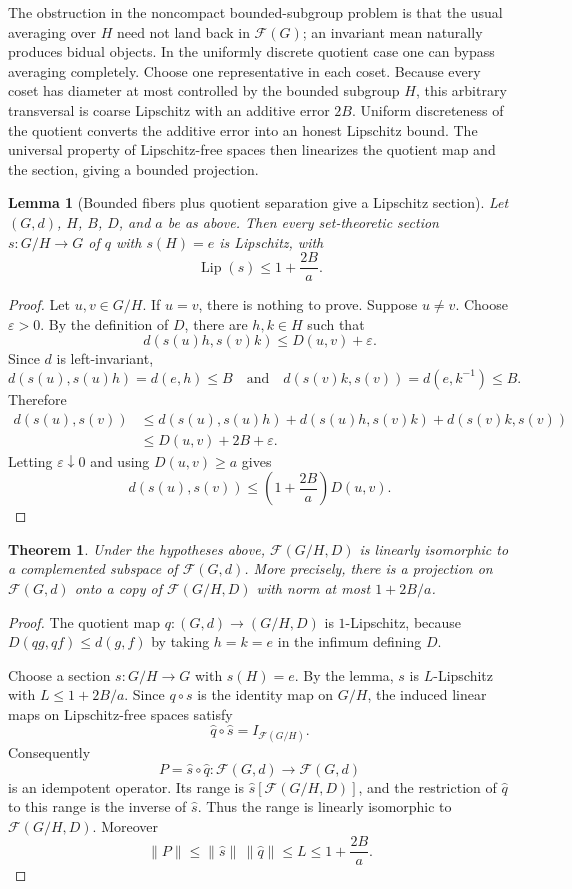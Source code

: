 \documentclass[11pt]{article}
\newtheorem{theorem}{Theorem}
\newtheorem{lemma}{Lemma}
\newcommand{\F}{\mathcal{F}}
\begin{document}
The obstruction in the noncompact bounded-subgroup problem is that the
usual averaging over $H$ need not land back in $\F(G)$; an invariant mean
naturally produces bidual objects. In the uniformly discrete quotient
case one can bypass averaging completely. Choose one representative in
each coset. Because every coset has diameter at most controlled by the
bounded subgroup $H$, this arbitrary transversal is coarse Lipschitz with
an additive error $2B$. Uniform discreteness of the quotient converts the
additive error into an honest Lipschitz bound. The universal property of
Lipschitz-free spaces then linearizes the quotient map and the section,
giving a bounded projection.

\begin{lemma}[Bounded fibers plus quotient separation give a Lipschitz section]
Let $(G,d)$, $H$, $B$, $D$, and $a$ be as above. Then every set-theoretic
section $s:G/H\to G$ of $q$ with $s(H)=e$ is Lipschitz, with
\[
  \operatorname{Lip}(s)\le 1+\frac{2B}{a}.
\]
\end{lemma}

\begin{proof}
Let $u,v\in G/H$. If $u=v$, there is nothing to prove. Suppose $u\ne v$.
Choose $\varepsilon>0$. By the definition of $D$, there are $h,k\in H$
such that
\[
  d(s(u)h,s(v)k)\le D(u,v)+\varepsilon.
\]
Since $d$ is left-invariant,
\[
  d(s(u),s(u)h)=d(e,h)\le B
  \quad\text{and}\quad
  d(s(v)k,s(v))=d(e,k^{-1})\le B.
\]
Therefore
\[
\begin{aligned}
  d(s(u),s(v))
  &\le d(s(u),s(u)h)+d(s(u)h,s(v)k)+d(s(v)k,s(v))\\
  &\le D(u,v)+2B+\varepsilon.
\end{aligned}
\]
Letting $\varepsilon\downarrow 0$ and using $D(u,v)\ge a$ gives
\[
  d(s(u),s(v))
  \le \left(1+\frac{2B}{a}\right)D(u,v).
\]
\end{proof}

\begin{theorem}
Under the hypotheses above, $\F(G/H,D)$ is linearly isomorphic to a
complemented subspace of $\F(G,d)$. More precisely, there is a projection
on $\F(G,d)$ onto a copy of $\F(G/H,D)$ with norm at most
$1+2B/a$.
\end{theorem}

\begin{proof}
The quotient map $q:(G,d)\to (G/H,D)$ is $1$-Lipschitz, because
$D(qg,qf)\le d(g,f)$ by taking $h=k=e$ in the infimum defining $D$.

Choose a section $s:G/H\to G$ with $s(H)=e$. By the lemma,
$s$ is $L$-Lipschitz with $L\le 1+2B/a$. Since $q\circ s$ is the identity
map on $G/H$, the induced linear maps on Lipschitz-free spaces satisfy
\[
  \widehat q\circ \widehat s = I_{\F(G/H)}.
\]
Consequently
\[
  P=\widehat s\circ \widehat q:\F(G,d)\to \F(G,d)
\]
is an idempotent operator. Its range is $\widehat s[\F(G/H,D)]$, and
the restriction of $\widehat q$ to this range is the inverse of
$\widehat s$. Thus the range is linearly isomorphic to $\F(G/H,D)$.
Moreover
\[
  \|P\|\le \|\widehat s\|\,\|\widehat q\|
  \le L\le 1+\frac{2B}{a}.
\]
\end{proof}
\end{document}

